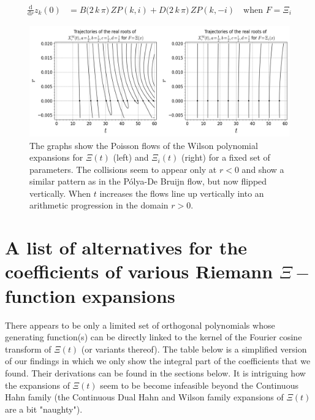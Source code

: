 \documentclass[a4paper,11pt,twoside]{amsart}
\newcommand{\verifiedeq}{=}
\newcommand{\verifiedeq}{\stackrel{\checkmark}{=}}
\begin{document}
\begin{small}
{\begin{minipage}{\textwidth}
\begin{align}
  \frac{\mathrm{d}}{\mathrm{d} r} z_k(0)&\verifiedeq B\big(2\,k\,\pi\big)\,ZP(k,i)+D\big(2\,k\,\pi)\,ZP(k,-i)\quad \text{when } F=\Xi_i 
\end{align}
\end{minipage}}
\begin{figure}[H]
  \includegraphics[width=1\linewidth]{WilsonFlowdouble.jpeg}
  \caption{The graphs show the Poisson flows of the Wilson polynomial expansions for $\Xi(t)$ (left) and $\Xi_i(t)$ (right) for a fixed set of parameters. The collisions seem to appear only at $r < 0$ and show a similar pattern as in the Pólya-De Bruijn flow, but now flipped vertically. When $t$ increases the flows line up vertically into an arithmetic progression in the domain $r > 0$.}
  \label{fig:flowW2}
\end{figure}
\end{small}
\pagebreak

\renewcommand{\theequation}{B.\arabic{equation}}
\setcounter{equation}{0}
\section{A list of alternatives for the coefficients of various Riemann $\Xi-$function expansions}\label{specexpansions}

There appears to be only a limited set of orthogonal polynomials whose generating function(s) can be directly linked to the kernel of the Fourier cosine transform of $\Xi(t)$ (or variants thereof). The table below is a simplified version of our findings in which we only show the integral part of the coefficients that we found. Their derivations can be found in the sections below. It is intriguing how the expansions of $\Xi(t)$ seem to be become infeasible beyond the Continuous Hahn family (the Continuous Dual Hahn and Wilson family expansions of $\Xi(t)$ are a bit "naughty"). 
\end{document}

